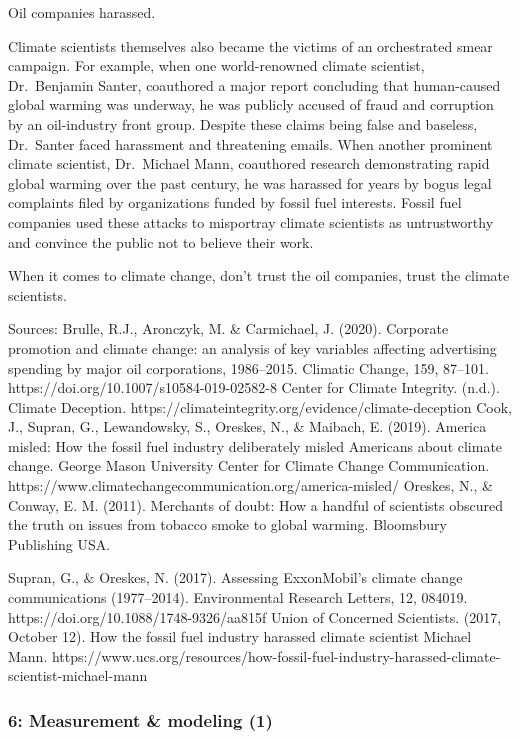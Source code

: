 \documentclass[
  letterpaper,
  DIV=11,
  numbers=noendperiod]{scrartcl}
\begin{document}
Oil companies harassed.

Climate scientists themselves also became the victims of an orchestrated
smear campaign. For example, when one world-renowned climate scientist,
Dr.~Benjamin Santer, coauthored a major report concluding that
human-caused global warming was underway, he was publicly accused of
fraud and corruption by an oil-industry front group. Despite these
claims being false and baseless, Dr.~Santer faced harassment and
threatening emails. When another prominent climate scientist,
Dr.~Michael Mann, coauthored research demonstrating rapid global warming
over the past century, he was harassed for years by bogus legal
complaints filed by organizations funded by fossil fuel interests.
Fossil fuel companies used these attacks to misportray climate
scientists as untrustworthy and convince the public not to believe their
work.

When it comes to climate change, don't trust the oil companies, trust
the climate scientists.

Sources: Brulle, R.J., Aronczyk, M. \& Carmichael, J. (2020). Corporate
promotion and climate change: an analysis of key variables affecting
advertising spending by major oil corporations, 1986--2015. Climatic
Change, 159, 87--101. https://doi.org/10.1007/s10584-019-02582-8 Center
for Climate Integrity. (n.d.). Climate Deception.
https://climateintegrity.org/evidence/climate-deception Cook, J.,
Supran, G., Lewandowsky, S., Oreskes, N., \& Maibach, E. (2019). America
misled: How the fossil fuel industry deliberately misled Americans about
climate change. George Mason University Center for Climate Change
Communication.
https://www.climatechangecommunication.org/america-misled/ Oreskes, N.,
\& Conway, E. M. (2011). Merchants of doubt: How a handful of scientists
obscured the truth on issues from tobacco smoke to global warming.
Bloomsbury Publishing USA.

Supran, G., \& Oreskes, N. (2017). Assessing ExxonMobil's climate change
communications (1977--2014). Environmental Research Letters, 12, 084019.
https://doi.org/10.1088/1748-9326/aa815f Union of Concerned Scientists.
(2017, October 12). How the fossil fuel industry harassed climate
scientist Michael Mann.
https://www.ucs.org/resources/how-fossil-fuel-industry-harassed-climate-scientist-michael-mann

\subsubsection{6: Measurement \& modeling
(1)}\label{measurement-modeling-1}
\end{document}
